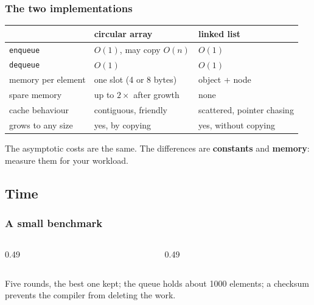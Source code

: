 \documentclass[aspectratio=169,10pt,compress]{beamer}
\begin{document}
\begin{frame}[t,fragile] \frametitle{The two implementations}
  \begin{center}\small
  \begin{tabular}{@{}lll@{}}
    \toprule
     & \textbf{circular array} & \textbf{linked list} \\
    \midrule
    \texttt{enqueue}      & $O(1)$, may copy $O(n)$ & $O(1)$ \\
    \texttt{dequeue}      & $O(1)$                  & $O(1)$ \\
    memory per element    & one slot (4 or 8 bytes) & object + node \\
    spare memory          & up to $2\times$ after growth & none \\
    cache behaviour       & contiguous, friendly    & scattered, pointer chasing \\
    grows to any size     & yes, by copying         & yes, without copying \\
    \bottomrule
  \end{tabular}
  \end{center}
  \vspace{0.4em}
  \small The asymptotic costs are the same. The differences are \textbf{constants} and \textbf{memory}: measure them for your workload.
\end{frame}


\subsection[Time]{Time}




\begin{frame}[t,fragile] \frametitle{A small benchmark}
  \begin{columns}[T]
    \begin{column}{0.49\textwidth}
    \end{column}
    \begin{column}{0.49\textwidth}
    \end{column}
  \end{columns}
  \small Five rounds, the best one kept; the queue holds about 1000 elements; a checksum prevents the compiler from deleting the work.
\end{frame}
\end{document}

